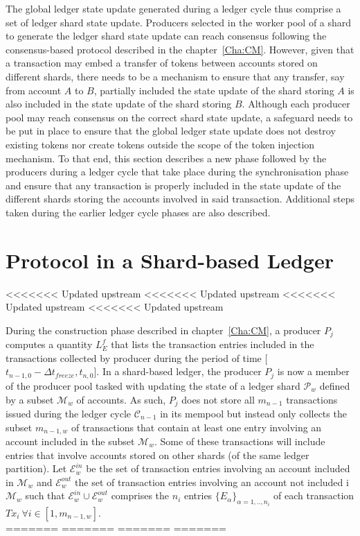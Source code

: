 The global ledger state update generated during a ledger cycle thus comprise a set of ledger shard state update. Producers selected in the worker pool of a shard to generate the ledger shard state update can reach consensus following the consensus-based protocol described in the chapter~\ref{Cha:CM}. However, given that a transaction may embed a transfer of tokens between accounts stored on different shards, there needs to be a mechanism to ensure that any transfer, say from account $A$ to $B$, partially included the state update of the shard storing $A$ is also included in the state update of the shard storing $B$. Although each producer pool may reach consensus on the correct shard state update, a safeguard needs to be put in place to ensure that the global ledger state update does not destroy existing tokens nor create tokens outside the scope of the token injection mechanism. To that end, this section describes a new phase followed by the producers during a ledger cycle that take place during the synchronisation phase and ensure that any transaction is properly included in the state update of the different shards storing the accounts involved in said transaction.  Additional steps taken during the earlier ledger cycle phases are also described.

\section{Protocol in a Shard-based Ledger}
<<<<<<< Updated upstream
<<<<<<< Updated upstream
<<<<<<< Updated upstream
<<<<<<< Updated upstream

During the construction phase described in chapter~\ref{Cha:CM}, a producer $P_j$ computes a quantity $L_E^f$ that lists the transaction entries included in the transactions collected by producer during the period of time [$t_{n-1,0} - \Delta t_{freeze}, t_{n,0}$]. In a shard-based ledger, the producer $P_j$ is now a member of the producer pool tasked with updating the state of a ledger shard $\mathcal{P}_w$ defined by a subset $\mathcal{M}_w$ of accounts. As such, $P_j$ does not store all $m_{n-1}$ transactions issued during the ledger cycle $\mathcal{C}_{n-1}$ in its mempool but instead only collects the subset $m_{n-1,w}$ of transactions that contain at least one entry involving  an account included in the subset $\mathcal{M}_w$. Some of these transactions will include entries that involve accounts stored on other shards (of the same ledger partition). Let $\mathcal{E}^{in}_w$ be the set of transaction entries involving an account included in $\mathcal{M}_w$ and $\mathcal{E}^{out}_w$ the set of transaction entries involving  an account not included i $\mathcal{M}_w$ such that $\mathcal{E}^{in}_w \cup \mathcal{E}^{out}_w$ comprises the $n_i$ entries $\{E_\alpha\}_{\alpha=1,..,n_i}$ of each transaction $Tx_i~\forall i \in  [1, m_{n-1,w}]$.\\
=======
=======
=======
=======

